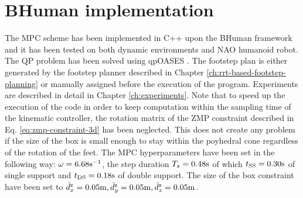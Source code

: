 \section{BHuman implementation}
The MPC scheme has been implemented in C++ upon the BHuman framework
\cite{BHumanCodeRelease2018} and it has been tested on both dynamic environments 
and NAO humanoid robot. The QP problem has been solved using qpOASES
\cite{qpOASES}. The footstep plan is either generated by the footstep planner 
described in Chapter \ref{ch:rrt-based-footstep-planning} or manually assigned 
before the execution of the program. Experiments are described in detail in 
Chapter \ref{ch:experiments}. Note that to speed up the execution of the code 
in order to keep computation within the sampling time of the kinematic 
controller, the rotation matrix of the ZMP constraint described in Eq.
\eqref{eq:zmp-constraint-3d} has been neglected. This does not create any
problem if the size of the box is small enough to stay within the poyhedral 
cone regardless of the rotation of the feet. The MPC hyperparameters have been 
set in the following way: $\omega=6.68 {\rm s}^{-1}$,
the step duration $T_s=0.48 {\rm s}$ of which $t_{\rm SS}=0.30 {\rm s}$ of
single support and 
$t_{\rm DS}=0.18 {\rm s}$ of double support. The size of the box constraint have 
been set to $\tilde{d}_x^{\rm z}=0.05 {\rm m}, \tilde{d}_y^{\rm z}=0.05 {\rm m},
\tilde{d}_z^{\rm z}=0.05 {\rm m}$.

